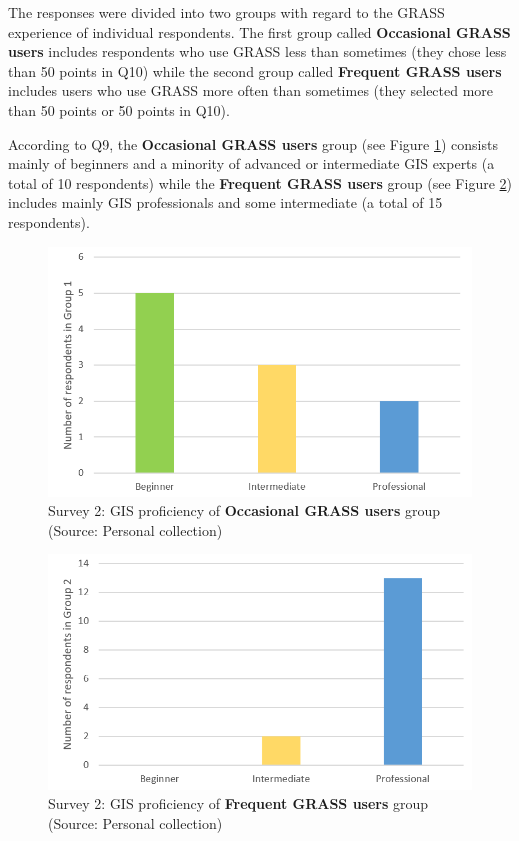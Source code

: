 \documentclass[a4paper,10pt,twoside]{article}
\begin{document}
The responses were divided into two groups with regard to the GRASS
experience of individual respondents. The first group called
\textbf{Occasional GRASS users} includes respondents who use GRASS
less than sometimes (they chose less than 50 points in Q10) while the
second group called \textbf{Frequent GRASS users} includes users who
use GRASS more often than sometimes (they selected more than 50 points
or 50 points in Q10).

According to Q9, the \textbf{Occasional GRASS users} group (see Figure
\ref{fig:survey2_respondents_group1}) consists mainly of beginners and
a minority of advanced or intermediate GIS experts (a total of 10
respondents) while the \textbf{Frequent GRASS users} group (see Figure
\ref{fig:survey2_respondents_group2}) includes mainly GIS
professionals and some intermediate (a total of 15 respondents).

\vspace{0.3cm}
\begin{figure}[hbt!] 
\begin{center}
\includegraphics[width=11.5cm]{../surveys/analyzed_data/survey2_respondents_group1.png} 
\caption[Survey 2: GIS proficiency of \textbf{Occasional GRASS users} group]{Survey 2: GIS proficiency of \textbf{Occasional GRASS users} group (Source: Personal collection)}
\label{fig:survey2_respondents_group1}
\end{center}
\end{figure}

\begin{figure}[hbt!] 
\begin{center}
\includegraphics[width=11.5cm]{../surveys/analyzed_data/survey2_respondents_group2.png} 
\caption[Survey 2: GIS proficiency of \textbf{Frequent GRASS users} group]{Survey 2: GIS proficiency of \textbf{Frequent GRASS users} group (Source: Personal collection)}
\label{fig:survey2_respondents_group2}
\end{center}
\end{figure}
\end{document}
